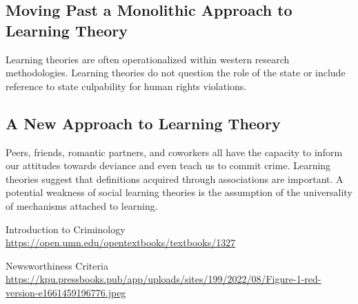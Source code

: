 \documentclass[11pt]{article}
\begin{document}
\subsection{Moving Past a Monolithic Approach to Learning Theory}

Learning theories are often operationalized within western research methodologies. Learning theories do not question the role of the state or include reference to state culpability for human rights violations.

\subsection{A New Approach to Learning Theory}

Peers, friends, romantic partners, and coworkers all have the capacity to inform our attitudes towards deviance and even teach us to commit crime. Learning theories suggest that definitions acquired through associations are important. A potential weakness of social learning theories is the assumption of the universality of mechanisms attached to learning. 


\newpage

\begin{thebibliography}{99}
    {Introduction to Criminology\\
    \url{https://open.umn.edu/opentextbooks/textbooks/1327}}

    {Newsworthiness Criteria\\
    \url{https://kpu.pressbooks.pub/app/uploads/sites/199/2022/08/Figure-1-red-version-e1661459196776.jpeg}}


\end{thebibliography}
\end{document}
